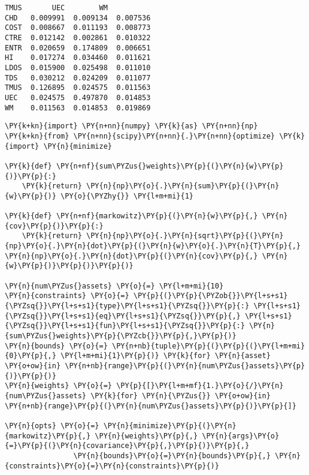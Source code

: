 \begin{Answer}
\begin{tcolorbox}[size=fbox, boxrule=1pt, colback=cellbackground, colframe=cellborder]
\begin{Verbatim}[commandchars=\\\{\}]
          TMUS       UEC        WM
CHD   0.009991  0.009134  0.007536
COST  0.008667  0.011193  0.008773
CTRE  0.012142  0.002861  0.010322
ENTR  0.020659  0.174809  0.006651
HI    0.017274  0.034460  0.011621
LDOS  0.015900  0.025498  0.011010
TDS   0.030212  0.024209  0.011077
TMUS  0.126895  0.024575  0.011563
UEC   0.024575  0.497870  0.014853
WM    0.011563  0.014853  0.019869
\end{Verbatim}
\end{tcolorbox}

\begin{tcolorbox}[size=fbox, boxrule=1pt, colback=cellbackground, colframe=cellborder]
\begin{Verbatim}[commandchars=\\\{\}]
\PY{k+kn}{import} \PY{n+nn}{numpy} \PY{k}{as} \PY{n+nn}{np}
\PY{k+kn}{from} \PY{n+nn}{scipy}\PY{n+nn}{.}\PY{n+nn}{optimize} \PY{k}{import} \PY{n}{minimize}
		
\PY{k}{def} \PY{n+nf}{sum\PYZus{}weights}\PY{p}{(}\PY{n}{w}\PY{p}{)}\PY{p}{:} 
    \PY{k}{return} \PY{n}{np}\PY{o}{.}\PY{n}{sum}\PY{p}{(}\PY{n}{w}\PY{p}{)} \PY{o}{\PYZhy{}} \PY{l+m+mi}{1}
		
\PY{k}{def} \PY{n+nf}{markowitz}\PY{p}{(}\PY{n}{w}\PY{p}{,} \PY{n}{cov}\PY{p}{)}\PY{p}{:}
    \PY{k}{return} \PY{n}{np}\PY{o}{.}\PY{n}{sqrt}\PY{p}{(}\PY{n}{np}\PY{o}{.}\PY{n}{dot}\PY{p}{(}\PY{n}{w}\PY{o}{.}\PY{n}{T}\PY{p}{,} \PY{n}{np}\PY{o}{.}\PY{n}{dot}\PY{p}{(}\PY{n}{cov}\PY{p}{,} \PY{n}{w}\PY{p}{)}\PY{p}{)}\PY{p}{)}
		
\PY{n}{num\PYZus{}assets} \PY{o}{=} \PY{l+m+mi}{10}
\PY{n}{constraints} \PY{o}{=} \PY{p}{(}\PY{p}{\PYZob{}}\PY{l+s+s1}{\PYZsq{}}\PY{l+s+s1}{type}\PY{l+s+s1}{\PYZsq{}}\PY{p}{:} \PY{l+s+s1}{\PYZsq{}}\PY{l+s+s1}{eq}\PY{l+s+s1}{\PYZsq{}}\PY{p}{,} \PY{l+s+s1}{\PYZsq{}}\PY{l+s+s1}{fun}\PY{l+s+s1}{\PYZsq{}}\PY{p}{:} \PY{n}{sum\PYZus{}weights}\PY{p}{\PYZcb{}}\PY{p}{,}\PY{p}{)} 
\PY{n}{bounds} \PY{o}{=} \PY{n+nb}{tuple}\PY{p}{(}\PY{p}{(}\PY{l+m+mi}{0}\PY{p}{,} \PY{l+m+mi}{1}\PY{p}{)} \PY{k}{for} \PY{n}{asset} \PY{o+ow}{in} \PY{n+nb}{range}\PY{p}{(}\PY{n}{num\PYZus{}assets}\PY{p}{)}\PY{p}{)}
\PY{n}{weights} \PY{o}{=} \PY{p}{[}\PY{l+m+mf}{1.}\PY{o}{/}\PY{n}{num\PYZus{}assets} \PY{k}{for} \PY{n}{\PYZus{}} \PY{o+ow}{in} \PY{n+nb}{range}\PY{p}{(}\PY{n}{num\PYZus{}assets}\PY{p}{)}\PY{p}{]}
		
\PY{n}{opts} \PY{o}{=} \PY{n}{minimize}\PY{p}{(}\PY{n}{markowitz}\PY{p}{,} \PY{n}{weights}\PY{p}{,} \PY{n}{args}\PY{o}{=}\PY{p}{(}\PY{n}{covariance}\PY{p}{,}\PY{p}{)}\PY{p}{,}
                \PY{n}{bounds}\PY{o}{=}\PY{n}{bounds}\PY{p}{,} \PY{n}{constraints}\PY{o}{=}\PY{n}{constraints}\PY{p}{)}
\end{Verbatim}
\end{tcolorbox}


\end{Answer}
